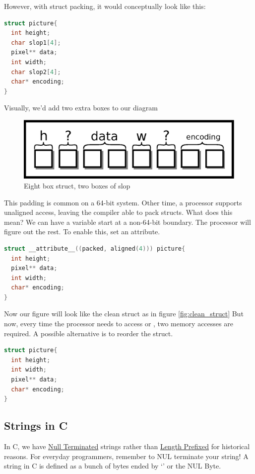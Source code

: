 However, with struct packing, it would conceptually look like this:

\begin{lstlisting}[language=C]
struct picture{
  int height;
  char slop1[4];
  pixel** data;
  int width;
  char slop2[4];
  char* encoding;
}
\end{lstlisting}

Visually, we'd add two extra boxes to our diagram

\begin{figure}[H]
\centering
\includegraphics[width=.7\textwidth]{introc/drawings/struct_slop.eps}
\caption{Eight box struct, two boxes of slop}
\label{fig:sloppy_struct}
\end{figure}

This padding is common on a 64-bit system.
Other time, a processor supports unaligned access, leaving the compiler able to pack structs.
What does this mean?
We can have a variable start at a non-64-bit boundary.
The processor will figure out the rest.
To enable this, set an attribute.

\begin{lstlisting}[language=C]
struct __attribute__((packed, aligned(4))) picture{
  int height;
  pixel** data;
  int width;
  char* encoding;
}
\end{lstlisting}

Now our figure will look like the clean struct as in figure  \ref{fig:clean_struct}
But now, every time the processor needs to access  or ,
two memory accesses are required.
A possible alternative is to reorder the struct.

\begin{lstlisting}[language=C]
struct picture{
  int height;
  int width;
  pixel** data;
  char* encoding;
}
\end{lstlisting}

\subsection{Strings in C}

In C, we have
\href{https://en.wikipedia.org/wiki/Null-terminated_string}{Null
	Terminated} strings rather than
\href{https://en.wikipedia.org/wiki/String_(computer_science)\#Length-prefixed}{Length
	Prefixed} for historical reasons.
For everyday programmers, remember to NUL terminate your string!
A string in C is defined as a bunch of bytes ended by `\0' or the NUL Byte.

